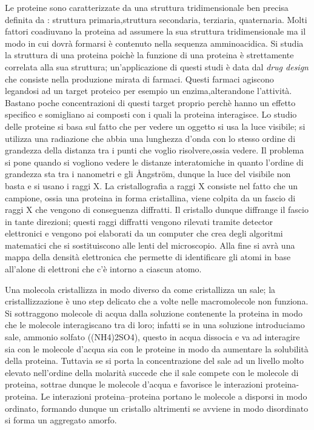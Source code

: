 \documentclass[twocolumn,a4paper,10pt]{my_report}
\begin{document}
{Le proteine sono caratterizzate da una struttura tridimensionale ben precisa definita da : struttura primaria,struttura secondaria, terziaria, quaternaria.
Molti fattori coadiuvano la proteina ad assumere la sua struttura tridimensionale ma il modo in cui dovrà formarsi è contenuto nella sequenza amminoacidica.
Si studia la struttura di una proteina poichè la funzione di una proteina è strettamente correlata alla sua struttura; un'applicazione di questi studi è data dal \emph{drug design} che consiste nella produzione mirata di farmaci. Questi farmaci agiscono legandosi ad un target proteico per esempio un enzima,alterandone l'attività. Bastano poche concentrazioni di questi target proprio perchè hanno un effetto specifico e somigliano ai composti con i quali la proteina interagisce.
Lo studio delle proteine si basa sul fatto che
per vedere un oggetto si usa la luce visibile; si utilizza una radiazione che abbia una lunghezza d'onda con lo stesso ordine di grandezza della distanza tra i punti che voglio risolvere,ossia vedere.
Il problema si pone quando si vogliono vedere le distanze interatomiche in quanto l'ordine di grandezza sta tra i nanometri e gli Ångström, dunque la luce del visibile non basta e si usano i raggi X.
La cristallografia a raggi X consiste nel fatto che un campione, ossia una proteina in forma cristallina, viene colpita da un fascio di raggi X che vengono di conseguenza diffratti. Il cristallo dunque diffrange il fascio in tante direzioni; questi raggi diffratti vengono rilevati tramite detector elettronici e vengono poi elaborati da un computer che crea degli algoritmi matematici che si sostituiscono alle lenti del microscopio. Alla fine si avrà una mappa della densità elettronica che permette di identificare gli atomi in base all'alone di elettroni che c'è intorno a ciascun atomo.

Una molecola cristallizza in modo diverso da come cristallizza un sale; la cristallizzazione è uno step delicato che a volte nelle macromolecole non funziona.
Si sottraggono molecole di acqua dalla soluzione contenente la proteina in modo che le molecole interagiscano tra di loro; infatti se in una soluzione introduciamo sale, ammonio solfato (\ch(NH4)2SO4), questo in acqua dissocia e va ad interagire sia con le molecole d'acqua sia con le proteine in modo da aumentare la solubilità della proteina. Tuttavia se si porta la concentrazione del sale ad un livello molto elevato nell'ordine della molarità succede che il sale compete con le molecole di proteina, sottrae dunque le molecole d'acqua e favorisce le interazioni proteina-proteina.
Le interazioni proteina--proteina portano le molecole a disporsi in modo ordinato, formando dunque un cristallo altrimenti se avviene in modo disordinato si forma un aggregato amorfo.

}
\end{document}
